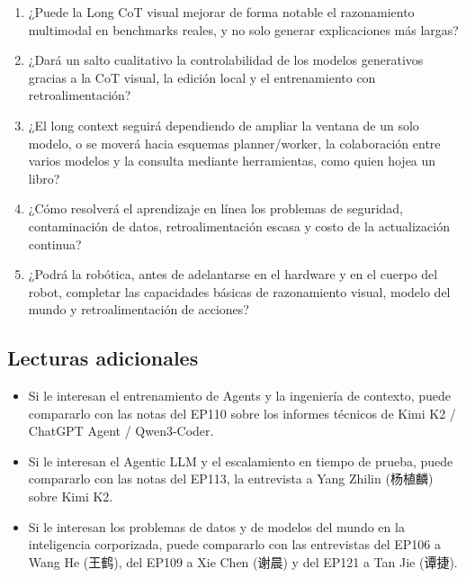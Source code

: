 \documentclass[a4paper]{article}
\begin{document}
\begin{enumerate}
\item ¿Puede la Long CoT visual mejorar de forma notable el razonamiento multimodal en benchmarks reales, y no solo generar explicaciones más largas?
\item ¿Dará un salto cualitativo la controlabilidad de los modelos generativos gracias a la CoT visual, la edición local y el entrenamiento con retroalimentación?
\item ¿El long context seguirá dependiendo de ampliar la ventana de un solo modelo, o se moverá hacia esquemas planner/worker, la colaboración entre varios modelos y la consulta mediante herramientas, como quien hojea un libro?
\item ¿Cómo resolverá el aprendizaje en línea los problemas de seguridad, contaminación de datos, retroalimentación escasa y costo de la actualización continua?
\item ¿Podrá la robótica, antes de adelantarse en el hardware y en el cuerpo del robot, completar las capacidades básicas de razonamiento visual, modelo del mundo y retroalimentación de acciones?
\end{enumerate}

\subsection{Lecturas adicionales}

\begin{itemize}
\item Si le interesan el entrenamiento de Agents y la ingeniería de contexto, puede compararlo con las notas del EP110 sobre los informes técnicos de Kimi K2 / ChatGPT Agent / Qwen3-Coder.
\item Si le interesan el Agentic LLM y el escalamiento en tiempo de prueba, puede compararlo con las notas del EP113, la entrevista a Yang Zhilin (杨植麟) sobre Kimi K2.
\item Si le interesan los problemas de datos y de modelos del mundo en la inteligencia corporizada, puede compararlo con las entrevistas del EP106 a Wang He (王鹤), del EP109 a Xie Chen (谢晨) y del EP121 a Tan Jie (谭捷).
\end{itemize}
\end{document}
